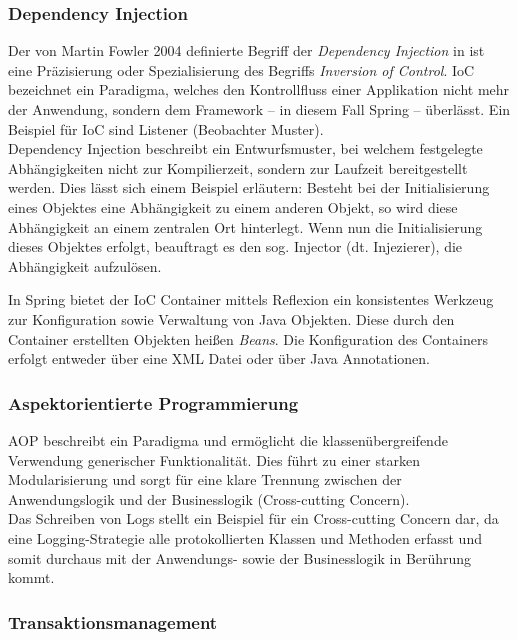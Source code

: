 			\subsubsection{Dependency Injection} %
			
				Der von Martin Fowler 2004 definierte Begriff der \textit{Dependency Injection} in \cite{MartinFowler.23.01.2020} ist eine Präzisierung oder Spezialisierung des Begriffs \textit{Inversion of Control}. \acs{IoC} bezeichnet ein Paradigma, welches den Kontrollfluss einer Applikation nicht mehr der Anwendung, sondern dem Framework -- in diesem Fall Spring -- überlässt. Ein Beispiel für \acs{IoC} sind Listener (Beobachter Muster). \\
				Dependency Injection beschreibt ein Entwurfsmuster, bei welchem festgelegte Abhängigkeiten nicht zur Kompilierzeit, sondern zur Laufzeit bereitgestellt werden. Dies lässt sich einem Beispiel erläutern: Besteht bei der Initialisierung eines Objektes eine Abhängigkeit zu einem anderen Objekt, so wird diese Abhängigkeit an einem zentralen Ort hinterlegt. Wenn nun die Initialisierung dieses Objektes erfolgt, beauftragt es den sog. Injector (dt. Injezierer), die Abhängigkeit aufzulösen. \cite{MartinFowler.23.01.2020}
				
				In Spring bietet der \acs{IoC} Container mittels Reflexion ein konsistentes Werkzeug zur Konfiguration sowie Verwaltung von Java Objekten. Diese durch den Container erstellten Objekten heißen \textit{Beans}. Die Konfiguration des Containers erfolgt entweder über eine \acs{XML} Datei oder über Java Annotationen. \cite{Walls.20162017} 
				
			\subsubsection{Aspektorientierte Programmierung}
			
				\acs{AOP} beschreibt ein Paradigma und ermöglicht die klassenübergreifende Verwendung generischer Funktionalität. Dies führt zu einer starken Modularisierung und sorgt für eine klare Trennung zwischen der Anwendungslogik und der Businesslogik (Cross-cutting Concern). \cite{Wunderlich.2005} \\
				Das Schreiben von Logs stellt ein Beispiel für ein Cross-cutting Concern dar, da eine Logging-Strategie alle protokollierten Klassen und Methoden erfasst und somit durchaus mit der Anwendungs- sowie der Businesslogik in Berührung kommt. 
			
			\subsubsection{Transaktionsmanagement} %
			\label{frameworks.spring.transaktionsmanagement}
			
